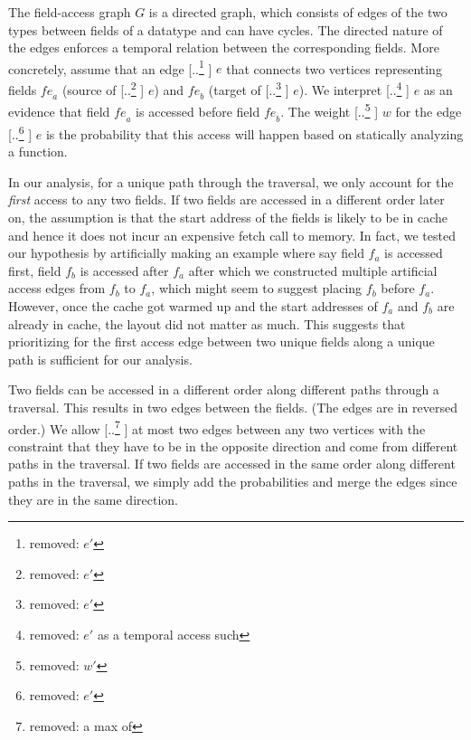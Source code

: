 \documentclass[acmsmall,review,anonymous]{acmart}\settopmatter{printfolios=true,printccs=false,printacmref=false}
\newcommand{\skeywd}[1]{\mathit{#1}}
\newcommand{\fields}{\skeywd{fe}}
\providecommand{\DIFaddtex}[1]{{\protect\color{blue} \sf #1}} %
\providecommand{\DIFdeltex}[1]{{\protect\color{red} [..\footnote{removed: #1} ]}} %
\providecommand{\DIFaddbegin}{} %
\providecommand{\DIFaddend}{} %
\providecommand{\DIFdelbegin}{} %
\providecommand{\DIFdelend}{} %
\providecommand{\DIFadd}[1]{\texorpdfstring{\DIFaddtex{#1}}{#1}} %
\providecommand{\DIFdel}[1]{\texorpdfstring{\DIFdeltex{#1}}{}} %
\newcommand{\DIFscaledelfig}{0.5}
\newlength{\DIFdelgraphicswidth} %
\newlength{\DIFdelgraphicsheight} %
\newcommand{\DIFaddincludegraphics}[2][]{{\color{blue}\fbox{\DIFOincludegraphics[#1]{#2}}}} %
\newcommand{\DIFdelincludegraphics}[2][]{%
\sbox{\DIFdelgraphicsbox}{\DIFOincludegraphics[#1]{#2}}%
\settoboxwidth{\DIFdelgraphicswidth}{\DIFdelgraphicsbox} %
\settoboxtotalheight{\DIFdelgraphicsheight}{\DIFdelgraphicsbox} %
\scalebox{\DIFscaledelfig}{%
\parbox[b]{\DIFdelgraphicswidth}{\usebox{\DIFdelgraphicsbox}\\[-\baselineskip] \rule{\DIFdelgraphicswidth}{0em}}\llap{\resizebox{\DIFdelgraphicswidth}{\DIFdelgraphicsheight}{%
\setlength{\unitlength}{\DIFdelgraphicswidth}%
\begin{picture}(1,1)%
\thicklines\linethickness{2pt} %
{\color[rgb]{1,0,0}\put(0,0){\framebox(1,1){}}}%
{\color[rgb]{1,0,0}\put(0,0){\line( 1,1){1}}}%
{\color[rgb]{1,0,0}\put(0,1){\line(1,-1){1}}}%
\end{picture}%
}\hspace*{3pt}}} %
} %
\DeclareRobustCommand{\DIFaddbegin}{\DIFOaddbegin \let\includegraphics\DIFaddincludegraphics} %
\DeclareRobustCommand{\DIFaddend}{\DIFOaddend \let\includegraphics\DIFOincludegraphics} %
\DeclareRobustCommand{\DIFdelbegin}{\DIFOdelbegin \let\includegraphics\DIFdelincludegraphics} %
\DeclareRobustCommand{\DIFdelend}{\DIFOaddend \let\includegraphics\DIFOincludegraphics} %
\begin{document}
The field-access graph $G$ is a directed graph, which consists of edges of the two types between fields of a datatype and can have cycles. The directed nature of the edges enforces a temporal relation between the corresponding fields. More concretely, assume that an edge \DIFdelbegin \DIFdel{$e'$ }\DIFdelend \DIFaddbegin \DIFadd{$e$ }\DIFaddend that connects two vertices representing fields $\fields_{a}$ (source of \DIFdelbegin \DIFdel{$e'$}\DIFdelend \DIFaddbegin \DIFadd{$e$}\DIFaddend ) and $\fields_{b}$ (target of \DIFdelbegin \DIFdel{$e'$}\DIFdelend \DIFaddbegin \DIFadd{$e$}\DIFaddend ). We interpret \DIFdelbegin \DIFdel{$e'$ as a temporal access such }\DIFdelend \DIFaddbegin \DIFadd{$e$ as an evidence }\DIFaddend that field $\fields_{a}$ is accessed before field $\fields_{b}$. The weight \DIFdelbegin \DIFdel{$w'$ }\DIFdelend \DIFaddbegin \DIFadd{$w$ }\DIFaddend for the edge \DIFdelbegin \DIFdel{$e'$ }\DIFdelend \DIFaddbegin \DIFadd{$e$ }\DIFaddend is the probability that this access will happen based on statically analyzing a function. 

In our analysis, for a unique path through the traversal, we only account for the {\em first} access to any two fields. If two fields are accessed in a different order later on, the assumption is that the start address of the fields is likely to be in cache and hence it does not incur an expensive fetch call to memory. In fact, we tested our hypothesis by artificially making an example where say field $f_{a}$ is accessed first, field $f_{b}$ is accessed after $f_{a}$ after which we constructed multiple artificial access edges from $f_{b}$ to $f_{a}$, which might seem to suggest placing $f_{b}$ before $f_{a}$. However, once the cache got warmed up and \DIFaddbegin \DIFadd{the }\DIFaddend start addresses of $f_{a}$ and $f_{b}$ are already in cache, the layout did not matter as much. This suggests that prioritizing for the first access edge between two unique fields along a unique path is sufficient for our analysis.

Two fields can be accessed in a different order along different paths through a traversal. This results in two edges between the fields. (The edges are in reversed order.) We allow \DIFdelbegin \DIFdel{a max of }\DIFdelend \DIFaddbegin \DIFadd{at most }\DIFaddend two edges between any two vertices with the constraint that they have to be in the opposite direction and come from different paths in the traversal. If two fields are accessed in the same order along different paths in the traversal, we simply add the probabilities and merge the edges since they are in the same direction.
\end{document}
